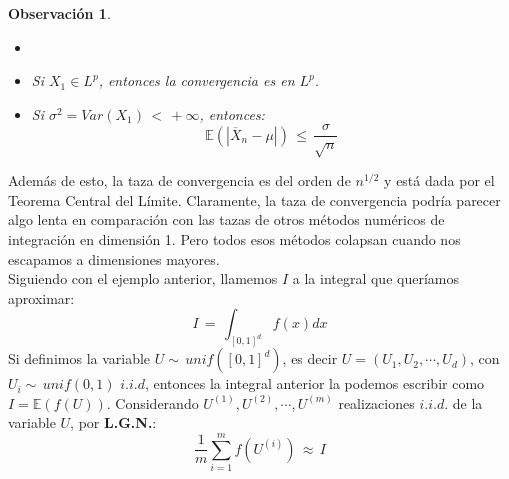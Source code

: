 \documentclass[a4paper]{article}
\numberwithin{equation}{subsection}
\newtheorem{obs}{Observación}
\def\E{\mathbb E}
\begin{document}
\begin{obs}
\begin{itemize}
    \item[]
    \item Si $X_1 \in L^p$, entonces la convergencia es en $L^p$.
    \item Si $\sigma^2 = Var(X_1)\,<\,+\infty$, entonces:
    \[\E\left( \left|\overline{X}_n-\mu\right|\right)\,\leq\,\frac{\sigma}{\sqrt{n}}\]
\end{itemize}
\end{obs}
Además de esto, la taza de convergencia es del orden de $n^{1/2}$ y está dada por el Teorema Central del Límite. Claramente, la taza de convergencia podría parecer algo lenta en comparación con las tazas de otros métodos numéricos de integración en dimensión 1. Pero todos esos métodos colapsan cuando nos escapamos a dimensiones mayores.\newline \\
Siguiendo con el ejemplo anterior, llamemos $I$ a la integral que queríamos aproximar:
\[I\,=\,\int_{[0,1]^d}f(x)dx\]
Si definimos la variable $U\sim\,unif([0,1]^d)$, es decir $U=(U_1,U_2,\cdots,U_d)$, con $U_i\sim\,unif(0,1)$ $i.i.d$, entonces la integral anterior la podemos escribir como $I=\E(f(U))$. Considerando $U^{(1)},U^{(2)},\cdots,U^{(m)}$ realizaciones $i.i.d.$ de la variable $U$, por \textbf{L.G.N.}:
\[\frac{1}{m}\sum_{i=1}^m f(U^{(i)})\,\approx\,I\]
\end{document}
